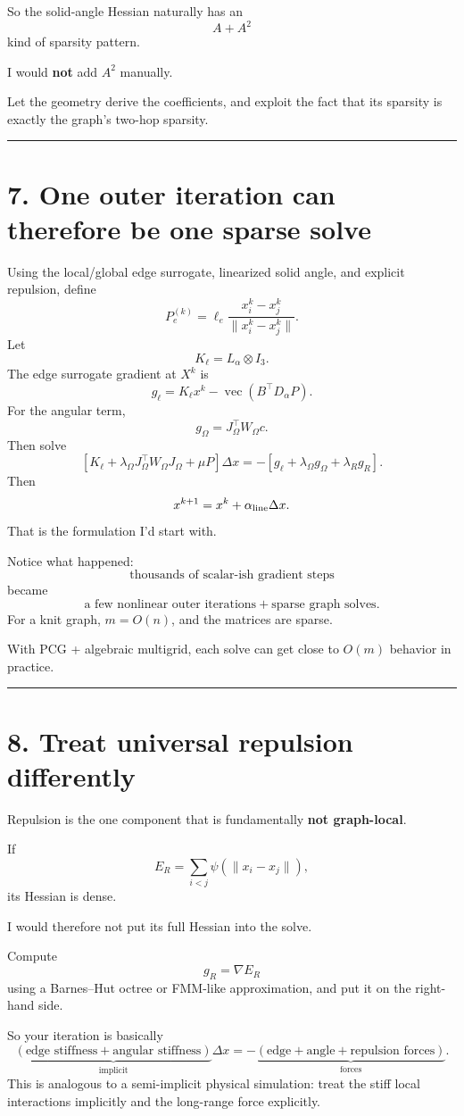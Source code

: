 \documentclass[11pt]{article}
\begin{document}
So the solid-angle Hessian naturally has an
\[
A+A^2
\]
kind of sparsity pattern.

I would \textbf{not} add \(A^2\) manually.

Let the geometry derive the coefficients, and exploit the fact that its
sparsity is exactly the graph's two-hop sparsity.

\bigskip\hrule

\section*{7. One outer iteration can therefore be one sparse solve}

Using the local/global edge surrogate, linearized solid angle, and explicit
repulsion, define
\[
P_e^{(k)}
=
\ell_e
\frac{x_i^k-x_j^k}
{\|x_i^k-x_j^k\|}.
\]
Let
\[
K_\ell=L_{\alpha}\otimes I_3.
\]
The edge surrogate gradient at \(X^k\) is
\[
g_\ell
=
K_\ell x^k
-
\operatorname{vec}(B^\top D_\alpha P).
\]
For the angular term,
\[
g_\Omega
=
J_\Omega^\top W_\Omega c.
\]
Then solve
\[
\boxed{
\left[
K_\ell
+
\lambda_\Omega
J_\Omega^\top W_\Omega J_\Omega
+
\mu P
\right]\Delta x
=
-
\left[
g_\ell+
\lambda_\Omega g_\Omega+
\lambda_R g_R
\right].
}
\]
Then
\[
x^{k+1}=x^k+\alpha_{\rm line}\Delta x.
\]
That is the formulation I'd start with.

Notice what happened:
\[
\text{thousands of scalar-ish gradient steps}
\]
became
\[
\text{a few nonlinear outer iterations}
+
\text{sparse graph solves}.
\]
For a knit graph, \(m=O(n)\), and the matrices are sparse.

With PCG + algebraic multigrid, each solve can get close to \(O(m)\)
behavior in practice.

\bigskip\hrule

\section*{8. Treat universal repulsion differently}

Repulsion is the one component that is fundamentally \textbf{not
graph-local}.

If
\[
E_R=\sum_{i<j}\psi(\|x_i-x_j\|),
\]
its Hessian is dense.

I would therefore not put its full Hessian into the solve.

Compute
\[
g_R=\nabla E_R
\]
using a Barnes--Hut octree or FMM-like approximation, and put it on the
right-hand side.

So your iteration is basically
\[
\underbrace{
(\text{edge stiffness}
+
\text{angular stiffness})
}_{\text{implicit}}
\Delta x
=
-
\underbrace{
(\text{edge}+\text{angle}+\text{repulsion forces})
}_{\text{forces}}.
\]
This is analogous to a semi-implicit physical simulation: treat the stiff
local interactions implicitly and the long-range force explicitly.
\end{document}

